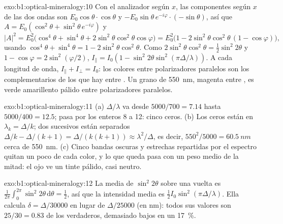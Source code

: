 \begin{solution}{exo:b1:optical-mineralogy:10}
Con el analizador según $x$, las componentes según $x$ de las dos ondas son
$E_0\cos\theta\cdot\cos\theta$ y $-E_0\sin\theta\,e^{-i\varphi}\cdot(-\sin\theta)$, así que
$A = E_0(\cos^2\theta + \sin^2\theta\,e^{-i\varphi})$ y
\[
  |A|^2 = E_0^2\bigl(\cos^4\theta + \sin^4\theta + 2\sin^2\theta\cos^2\theta\cos\varphi\bigr)
  = E_0^2\bigl(1 - 2\sin^2\theta\cos^2\theta\,(1 - \cos\varphi)\bigr),
\]
usando $\cos^4\theta + \sin^4\theta = 1 - 2\sin^2\theta\cos^2\theta$. Como
$2\sin^2\theta\cos^2\theta = \frac12\sin^2 2\theta$ y $1 - \cos\varphi =
2\sin^2(\varphi/2)$, $I_\parallel = I_0(1 - \sin^2 2\theta\sin^2(\pi\Delta/\lambda))$.
A cada longitud de onda, $I_\parallel + I_\perp = I_0$: los colores entre polarizadores paralelos son los complementarios
de los que hay entre . Un grano de \qty{550}{nm}, magenta entre , es verde amarillento
pálido entre polarizadores paralelos.
\end{solution}

\begin{solution}{exo:b1:optical-mineralogy:11}
(a) $\Delta/\lambda$ va desde $5000/700 = 7.14$ hasta $5000/400 = 12.5$; pasa por los enteros 8 a 12: cinco ceros.
(b) Los ceros están en $\lambda_k = \Delta/k$; dos sucesivos están separados
$\Delta/k - \Delta/(k + 1) =
\Delta/(k(k + 1)) \approx \lambda^2/\Delta$, es decir, $550^2/5000 =
\qty{60.5}{nm}$ cerca de \qty{550}{nm}. (c) Cinco bandas oscuras y estrechas repartidas por el espectro quitan un poco de
cada color, y lo que queda pasa con un peso medio de la mitad: el ojo ve un tinte pálido, casi neutro.
\end{solution}

\begin{solution}{exo:b1:optical-mineralogy:12}
La media de $\sin^2 2\theta$ sobre una vuelta es $\frac1{2\pi}\int_0^{2\pi}\sin^2 2\theta\,
\mathrm d\theta = \frac12$, así que la intensidad media es $\frac12 I_0\sin^2(\pi\Delta/\lambda)$. Ella calcula
$\delta = \Delta/30000$ en lugar de $\Delta/25000$ (en nm): todos sus valores son $25/30 = 0.83$ de los verdaderos,
demasiado bajos en un \qty{17}{\percent}.
\end{solution}

